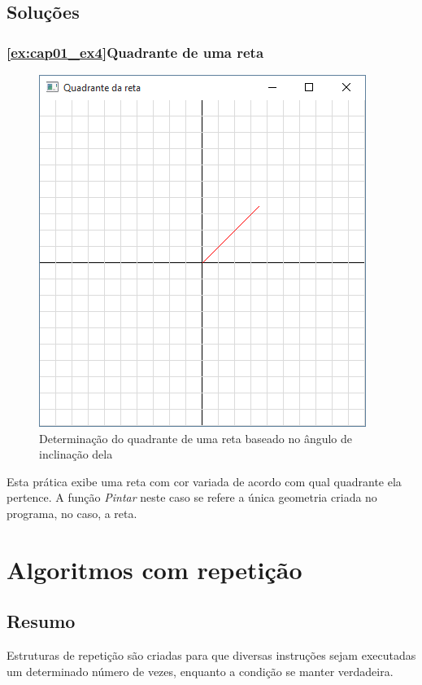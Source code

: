 \section{Soluções}

\subsection{\ref{ex:cap01_ex4}Quadrante de uma reta}
\begin{figure}[ht]
  \centerline{\includegraphics[width=.5\textwidth]{img/cap1_ex4.png}}
  \caption{Determinação do quadrante de uma reta baseado no ângulo de inclinação dela}
  \label{fig:cap01_ex4}
\end{figure}
Esta prática exibe uma reta com cor variada de acordo com qual quadrante ela pertence. A função \emph{Pintar} neste caso se refere a única geometria criada no programa, no caso, a reta.



\chapter[Algoritmos com repetição]
{Algoritmos com repetição}



\section{Resumo}

Estruturas de repetição são criadas para que diversas instruções sejam executadas um determinado número de vezes, enquanto a condição se manter verdadeira.


%
%

